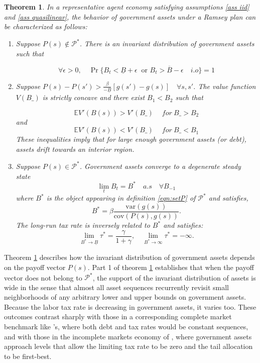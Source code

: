 \documentclass[thmsb,11pt]{article}
\newtheorem{theorem}{Theorem}
\newcommand{\var}{\mathrm{var}}
\newcommand{\cov}{\mathrm{cov}}
\begin{document}
\begin{theorem}
\label{thm: rep agent general theorem}
In a representative agent economy satisfying assumptions \ref{ass iid} and \ref{ass quasilinear}, the behavior of  government assets under a Ramsey plan
can be characterized as follows:
\begin{enumerate}
 \item Suppose $P(s) \not \in \mathcal{P}^*$.  There is an invariant distribution of government assets such that

\[\forall \epsilon>0, \quad \Pr\{B_t<\underline{B}+\epsilon  \ \text{ or } B_t>\overline{B}-\epsilon \quad i.o \}=1\]

\item Suppose  $P(s)-P(s')>\frac{\beta}{-\underline{B}}[g(s')-g(s)]\quad \forall s,s'$.
The value function $V(B\_)$ is strictly concave and there exist $B_1<B_2$ such that

\[\mathbb{E}V'(B(s))>V'(B\_) \quad \ for \ B\_>B_2 \]
and
\[\mathbb{E}V'(B(s))<V'(B\_) \quad \ for \  B\_<B_1 \]
These inequalities imply that for large enough government assets (or debt),
assets drift towards an interior region. %
\item Suppose $P(s)\in \mathcal{P}^*$.  Government assets converge to a degenerate steady state
\[\lim_tB_t=  B^*\quad a.s \quad \forall B_{-1} \]
where $B^*$ is the object appearing in definition \eqref{eqn:setP} of $\mathcal{P}^*$ and satisfies,
\begin{equation} \label{ss-debt} B^*=\beta \frac{\var(g(s))}{\cov(P(s),g(s))}. \end{equation}
The long-run tax rate is inversely related to $B^*$ and satisfies:
\[\lim_{B^*\to\underline{B}}\tau^*=\frac{\gamma}{1+\gamma}, \quad \lim_{B^*\to\infty}\tau^*=-\infty .\]

\end{enumerate}


\end{theorem}


\color{black}
Theorem \ref{thm: rep agent general theorem}  describes how  the invariant distribution of government assets depends on the payoff vector $P(s)$.
Part 1 of theorem \ref{thm: rep agent general theorem}  establishes that when the payoff vector does  not belong to $\mathcal{P}^*$, the support of the invariant distribution of assets is wide in the sense that almost all
asset sequences recurrently revisit  small neighborhoods of  any arbitrary lower and upper bounds on government assets.
Because the labor tax rate is decreasing in government assets, it varies too. These outcomes contrast sharply with those   in a corresponding complete market benchmark
like \citeauthor{LucasJr.1983}'s, where both debt and tax rates would be constant  sequences,  and with those in the incomplete markets economy of  \citeauthor{Aiyagari2002},
  where government assets approach levels that allow the  limiting tax rate to be zero and the tail allocation to be first-best.
\end{document}
